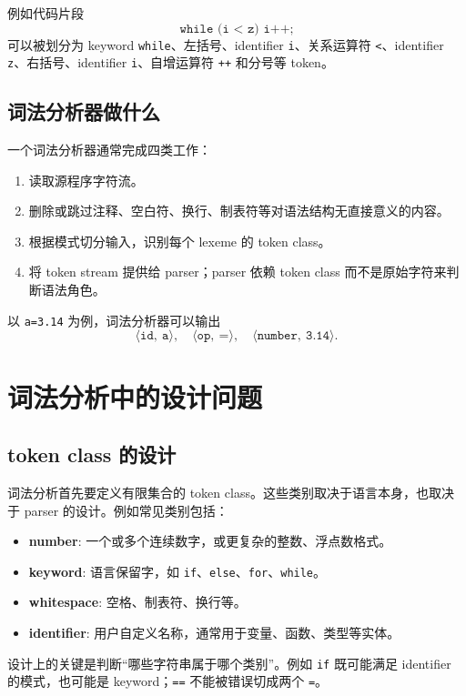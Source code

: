 \documentclass[11pt,a4paper]{article}
\newcommand{\token}[2]{\ensuremath{\langle \texttt{#1},\ \texttt{#2}\rangle}}
\newcommand{\code}[1]{\texttt{#1}}
\begin{document}
例如代码片段
\[
\code{while (i < z) i++;}
\]
可以被划分为 keyword \code{while}、左括号、identifier \code{i}、关系运算符 \code{<}、identifier \code{z}、右括号、identifier \code{i}、自增运算符 \code{++} 和分号等 token。

\subsection{词法分析器做什么}

一个词法分析器通常完成四类工作：

\begin{enumerate}
  \item 读取源程序字符流。
  \item 删除或跳过注释、空白符、换行、制表符等对语法结构无直接意义的内容。
  \item 根据模式切分输入，识别每个 lexeme 的 token class。
  \item 将 token stream 提供给 parser；parser 依赖 token class 而不是原始字符来判断语法角色。
\end{enumerate}

以 \code{a=3.14} 为例，词法分析器可以输出
\[
\token{id}{a},\quad \token{op}{=},\quad \token{number}{3.14}.
\]

\section{词法分析中的设计问题}

\subsection{token class 的设计}

词法分析首先要定义有限集合的 token class。这些类别取决于语言本身，也取决于 parser 的设计。例如常见类别包括：

\begin{itemize}
  \item \textbf{number}: 一个或多个连续数字，或更复杂的整数、浮点数格式。
  \item \textbf{keyword}: 语言保留字，如 \code{if}、\code{else}、\code{for}、\code{while}。
  \item \textbf{whitespace}: 空格、制表符、换行等。
  \item \textbf{identifier}: 用户自定义名称，通常用于变量、函数、类型等实体。
\end{itemize}

设计上的关键是判断“哪些字符串属于哪个类别”。例如 \code{if} 既可能满足 identifier 的模式，也可能是 keyword；\code{==} 不能被错误切成两个 \code{=}。
\end{document}
